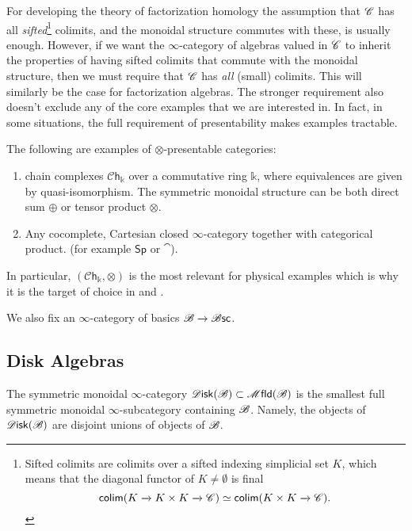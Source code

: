 \documentclass[../text]{subfiles}
\begin{document}
\begin{remark}
    For developing the theory of factorization homology the assumption that $\mathscr{C}$ has all \emph{sifted}\footnote{Sifted colimits are colimits over a sifted indexing simplicial set $K$, which means that the diagonal functor of $K \neq \emptyset$ is final \[ \mathsf{colim}(K \xrightarrow{} K \times K \xrightarrow{} \mathscr{C}) \simeq \mathsf{colim}(K \times K \xrightarrow{} \mathscr{C}).\]} colimits, and the monoidal structure commutes with these, is usually enough. However, if we want the $\infty$-category of algebras valued in $\mathscr{C}$ to inherit the properties of having sifted colimits that commute with the monoidal structure, then we must require that $\mathscr{C}$ has \emph{all} (small) colimits. This will similarly be the case for factorization algebras. The stronger requirement also doesn't exclude any of the core examples that we are interested in. In fact, in some situations, the full requirement of presentability makes examples tractable.
\end{remark}

\begin{example}
    The following are examples of $\otimes$-presentable categories:
    \begin{enumerate}
        \item chain complexes $\mathscr{C}\mathsf{h}_{\mathbb{k}}$ over a commutative ring $\mathbb{k}$, where equivalences are given by quasi-isomorphism. The symmetric monoidal structure can be both direct sum $\oplus$ or tensor product $\otimes$.
        \item Any cocomplete, Cartesian closed $\infty$-category together with categorical product. (for example $\mathsf{Sp}$ or $\cat$).
    \end{enumerate}
    In particular, $(\mathscr{C}\mathsf{h}_{\mathbb{k}}, \otimes)$ is the most relevant for physical examples which is why it is the target of choice in \cite{cg2016} and \cite{ginot2015}.
\end{example}

We also fix an $\infty$-category of basics $\mathscr{B} \xrightarrow{} \mathscr{B} \mathsf{sc}$.



\subsection{Disk Algebras}

\begin{definition}
    The symmetric monoidal $\infty$-category $\disk(\bstr) \subset \mfld(\bstr)$ is the smallest full symmetric monoidal $\infty$-subcategory containing $\mathscr{B}$. Namely, the objects of $\disk(\bstr)$ are disjoint unions of objects of $\mathscr{B}$.
\end{definition}
\end{document}
